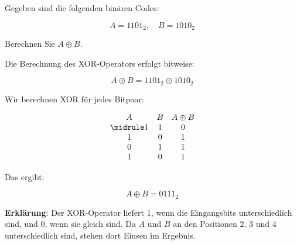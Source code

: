 \begin{myexercise}
    Gegeben sind die folgenden binären Codes:

    \[
        A = 1101_2, \quad B = 1010_2
    \]

    Berechnen Sie \( A \oplus B \).

    \begin{myanswer}
        Die Berechnung des \acrshort{XOR}-Operators erfolgt bitweise:

        \[
            A \oplus B = 1101_2 \oplus 1010_2
        \]

        Wir berechnen \acrshort{XOR} für jedes Bitpaar:

        \[
            \begin{array}{ccc}
                A & B & A \oplus B \\\midrule
                1 & 1 & 0          \\
                1 & 0 & 1          \\
                0 & 1 & 1          \\
                1 & 0 & 1          \\
            \end{array}
        \]

        Das ergibt:

        \[
            A \oplus B = 0111_2
        \]

        \textbf{Erklärung}:
        Der \acrshort{XOR}-Operator liefert 1, wenn die Eingangsbits unterschiedlich sind, und 0, wenn sie gleich sind. Da \( A \) und \( B \) an den Positionen 2, 3 und 4 unterschiedlich sind, stehen dort Einsen im Ergebnis.

    \end{myanswer}
\end{myexercise}


